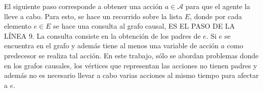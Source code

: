 El siguiente paso corresponde a obtener una acción $a \in \mathcal{A}$ para que el agente la lleve a cabo.
Para esto, se hace un recorrido sobre la lista $E$, donde
por cada elemento $e \in E$ se hace una consulta al grafo causal, ES EL PASO DE LA LÍNEA 9. La consulta consiste en la
obtención de los padres de $e$.  Si $e$ se encuentra en el grafo y además tiene al menos una variable de acción $a$ como predecesor se realiza tal acción.
En este trabajo, sólo se abordan problemas donde en los grafos causales, los vértices que representan las acciones no tienen padres y además no es necesario llevar a cabo varias acciones al mismo tiempo para afectar a $e$.




